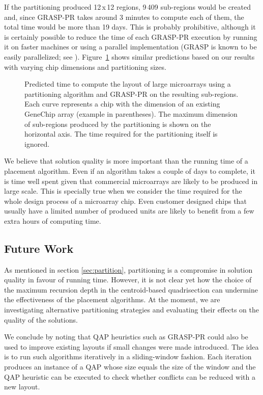 \documentclass{bioinfo}
\begin{document}
If the partitioning produced 12\,x\,12 regions, 9\,409 sub-regions would be created and, since GRASP-PR takes around 3 minutes to compute each of them, the total time would be more than 19 days. This is probably prohibitive, although it is certainly possible to reduce the time of each GRASP-PR execution by running it on faster machines or using a parallel implementation (GRASP is known to be easily parallelized; see \citealp{LI94}). Figure~\ref{fig:time_extrapolation} shows similar predictions based on our results with varying chip dimensions and partitioning sizes.

\begin{figure}
\caption{Predicted time to compute the layout of large microarrays using a partitioning algorithm and GRASP-PR on the resulting sub-regions. Each curve represents a chip with the dimension of an existing GeneChip array (example in parentheses). The maximum dimension of sub-regions produced by the partitioning is shown on the horizontal axis. The time required for the partitioning itself is ignored.}\label{fig:time_extrapolation}
\end{figure}

We believe that solution quality is more important than the running time of a placement algorithm. Even if an algorithm takes a couple of days to complete, it is time well spent given that commercial microarrays are likely to be produced in large scale. This is specially true when we consider the time required for the whole design process of a microarray chip. Even customer designed chips that usually have a limited number of produced units are likely to benefit from a few extra hours of computing time.

\subsection{Future Work}

As mentioned in section \ref{sec:partition}, partitioning is a compromise in solution quality in favour of running time. However, it is not clear yet how the choice of the maximum recursion depth in the centroid-based quadrisection can undermine the effectiveness of the placement algorithms. At the moment, we are investigating alternative partitioning strategies and evaluating their effects on the quality of the solutions.

We conclude by noting that QAP heuristics such as GRASP-PR could also be used to improve existing layouts if small changes were made introduced. The idea is to run such algorithms iteratively in a sliding-window fashion. Each iteration produces an instance of a QAP whose size equals the size of the window and the QAP heuristic can be executed to check whether conflicts can be reduced with a new layout.
\end{document}
